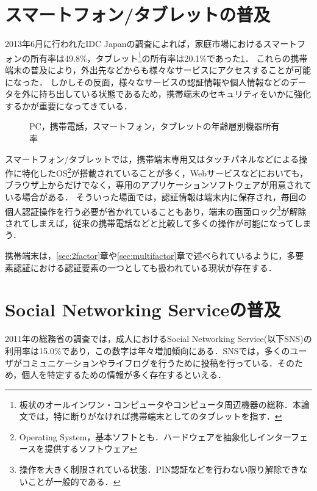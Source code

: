 \section{スマートフォン/タブレットの普及}
2013年6月に行われたIDC Japanの調査\cite{idcsmartphone}によれば，家庭市場におけるスマートフォンの所有率は49.8\%，タブレット\footnote{板状のオールインワン・コンピュータやコンピュータ周辺機器の総称．本論文では，特に断りがなければ携帯端末としてのタブレットを指す．}の所有率は20.1\%であった\ref{fig:smartphoneUsage}．
これらの携帯端末の普及により，外出先などからも様々なサービスにアクセスすることが可能になった．
しかしその反面，様々なサービスの認証情報や個人情報などのデータを外に持ち出している状態であるため，携帯端末のセキュリティをいかに強化するかが重要になってきている．

\begin{figure}[th]
\begin{center}
\end{center}
\caption{PC，携帯電話，スマートフォン，タブレットの年齢層別機器所有率}
\label{fig:smartphoneUsage}
\end{figure}

スマートフォン/タブレットでは，携帯端末専用又はタッチパネルなどによる操作に特化したOS\footnote{Operating System，基本ソフトとも．ハードウェアを抽象化しインターフェースを提供するソフトウェア}が搭載されていることが多く，Webサービスなどにおいても，ブラウザ上からだけでなく，専用のアプリケーションソフトウェアが用意されている場合がある．
そういった場面では，認証情報は端末内に保存され，毎回の個人認証操作を行う必要が省かれていることもあり，端末の画面ロック\footnote{操作を大きく制限されている状態．PIN認証などを行わない限り解除できないことが一般的である．}が解除されてしまえば，従来の携帯電話などと比較して多くの操作が可能になってしまう．

携帯端末は，\ref{sec:2factor}章や\ref{sec:multifactor}章で述べられているように，多要素認証における認証要素の一つとしても扱われている現状が存在する．

\section{Social Networking Serviceの普及}
2011年の総務省の調査\cite{micwhitepaper24}では，成人におけるSocial Networking Service(以下SNS)の利用率は15.0\%であり，この数字は年々増加傾向にある．SNSでは，多くのユーザがコミュニケーションやライフログを行うために投稿を行っている．そのため，個人を特定するための情報が多く存在するといえる．

